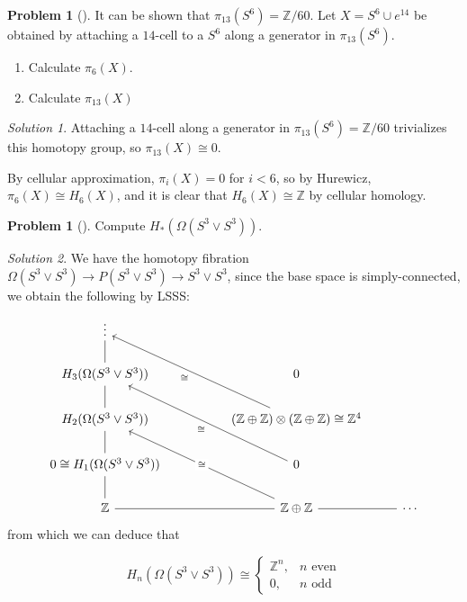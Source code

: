 \documentclass[reqno]{amsart}
\theoremstyle{definition}
\newtheorem{problem}[theorem]{Problem}
\theoremstyle{remark}
\newtheorem*{solution}{Solution}
\begin{document}
    \begin{problem}[]
        It can be shown that
        $\pi_{13} (S^{6}) = \mathbb{Z} / 60$.
        Let $X = S^{6} \cup  e^{14}$ be obtained
        by attaching a $14$-cell to a $S^{6}$ along a generator
        in $\pi_{13}\left( S^{6} \right) $.
        \begin{enumerate}
            \item Calculate $\pi_6(X)$.
            \item Calculate $\pi_{13}(X)$
        \end{enumerate}
    \end{problem}

    \begin{solution}
        Attaching a $14$-cell along a generator
        in $\pi_{13}(S^{6}) = \mathbb{Z} /60$ trivializes
        this homotopy group, so
        $\pi_{13}\left( X \right) \cong 0$.

        By cellular approximation, 
        $\pi_i (X) = 0$ for $i < 6$, so by Hurewicz,
        $\pi_6(X) \cong H_6(X)$, and it is clear that
        $H_6(X) \cong \mathbb{Z}$ by cellular homology.
    \end{solution}

    \begin{problem}[]
        Compute $H_* \left( \Omega \left( S^3
        \vee S^3 \right)  \right) $.
    \end{problem}

    \begin{solution}
        We have the homotopy fibration
        $\Omega \left( S^3 \vee S^3 \right) 
        \to P \left( S^3 \vee S^3 \right) \to 
        S^3 \vee S^3$, since the base space is simply-connected,
        we obtain the following by LSSS:
\[\begin{tikzcd}
	\vdots \\
	{H_3(\Omega (S^3 \vee S^3))} && 0 \\
	{H_2(\Omega (S^3 \vee S^3))} && {(\mathbb{Z} \oplus \mathbb{Z}) \otimes (\mathbb{Z} \oplus \mathbb{Z}) \cong \mathbb{Z}^4} \\
	{0 \cong H_1(\Omega (S^3 \vee S^3))} && 0 \\
	{\mathbb{Z}} && {\mathbb{Z} \oplus \mathbb{Z}} & \cdots
	\arrow[no head, from=2-1, to=1-1]
	\arrow[no head, from=3-1, to=2-1]
	\arrow["\cong", from=3-3, to=1-1]
	\arrow[no head, from=4-1, to=3-1]
	\arrow["\cong", from=4-3, to=2-1]
	\arrow[no head, from=5-1, to=4-1]
	\arrow[no head, from=5-1, to=5-3]
	\arrow["\cong"{description}, from=5-3, to=3-1]
	\arrow[no head, from=5-3, to=5-4]
\end{tikzcd}\]
from which we can deduce that


\[
H_{n} \left( \Omega \left( S^3 \vee S^3 \right)  \right) 
\cong
\begin{cases}
    \mathbb{Z}^{n},& n \text{ even}\\
    0,& n \text{ odd}
\end{cases}
\] 

    \end{solution}
\end{document}
